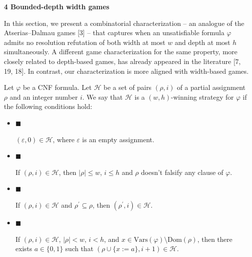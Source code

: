 \par\medskip\noindent\textbf{
4 Bounded-depth width games}\par


In this section, we present a combinatorial characterization – an analogue of the
Atserias–Dalmau games [3] – that captures when an unsatisfiable formula
$\varphi$ admits no resolution refutation of both width at most $w$ and depth at most $h$ simultaneously.
A different game characterization for the same property, more closely related to depth-based games,
has already appeared in the literature [7, 19, 18].
In contrast, our characterization is more aligned with width-based games.\par



Let $\varphi$ be a CNF formula. Let $\mathcal{H}$ be a set of pairs $(\rho,i)$ of a
partial assignment $\rho$ and an integer number $i$.
We say that $\mathcal{H}$ is a $(w,h)$-winning strategy for $\varphi$
if the following conditions hold:\par


\begin{itemize}


\item 
$\blacksquare$ 


$(\varepsilon,0)\in\mathcal{H}$, where $\varepsilon$ is an empty assignment.\par





\item 
$\blacksquare$ 


If $(\rho,i)\in\mathcal{H}$, then $|\rho|\leq w$, $i\leq h$ and $\rho$
doesn’t falsify any clause of $\varphi$.\par





\item 
$\blacksquare$ 


If $(\rho,i)\in\mathcal{H}$ and $\rho^{\prime}\subseteq\rho$, then
$(\rho^{\prime},i)\in\mathcal{H}$.\par





\item 
$\blacksquare$ 


If $(\rho,i)\in\mathcal{H}$, $|\rho|<w$, $i<h$,
and $x\in\mathrm{Vars}(\varphi)\setminus\mathrm{Dom}(\rho)$, then there exists $a\in\{0,1\}$
such that $(\rho\cup\{x:=a\},i+1)\in\mathcal{H}$.\par





\end{itemize}



